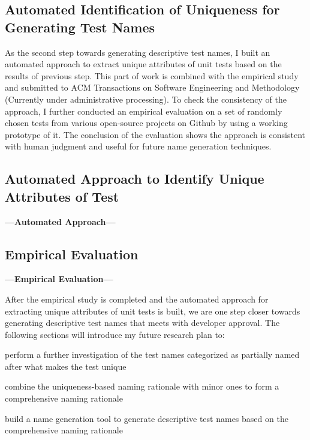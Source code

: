 \subsection{Automated Identification of Uniqueness for Generating Test Names}
\label{sec:uniquness-approach}

As the second step towards generating descriptive test names, I built an automated approach to extract unique attributes of unit tests based on the results of previous step.
%
This part of work is combined with the empirical study and submitted to ACM Transactions on Software Engineering and Methodology (Currently under administrative processing).
%
To check the consistency of the approach, I further conducted an empirical evaluation on a set of randomly chosen tests from various open-source projects on Github by using a working prototype of it.
%
The conclusion of the evaluation shows the approach is consistent with human judgment and useful for future name generation techniques.


\subsection{Automated Approach to Identify Unique Attributes of Test}
\label{sec:auto-approach}
\textbf{---Automated Approach---}

\subsection{Empirical Evaluation}
\label{sec:emp-eval}
\textbf{---Empirical Evaluation---}


After the empirical study is completed and the automated approach for extracting unique attributes of unit tests is built, we are one step closer towards generating descriptive test names that meets with developer approval.
%
The following sections will introduce my future research plan to:
\begin{enumerate*}
    \item perform a further investigation of the test names categorized as partially named after what makes the test unique
    \item combine the uniqueness-based naming rationale with minor ones to form a comprehensive naming rationale
    \item build a name generation tool to generate descriptive test names based on the comprehensive naming rationale 
\end{enumerate*}

